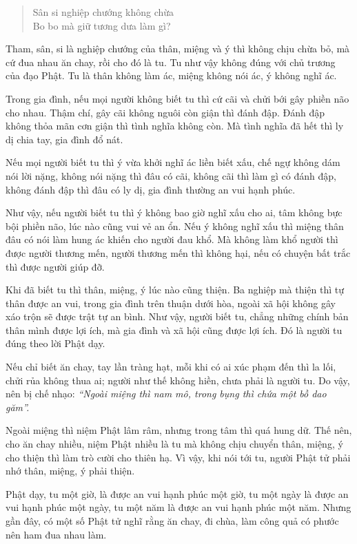 \documentclass[
  12pt,
  oneside]{book}
\begin{document}
\begin{quote}
Sân si nghiệp chướng không chừa\\
Bo bo mà giữ tương dưa làm gì?
\end{quote}

Tham, sân, si là nghiệp chướng của thân, miệng và ý thì không chịu chừa bỏ, mà cứ đua nhau ăn chay, rồi cho đó là tu. Tu như vậy không đúng với chủ trương của đạo Phật. Tu là thân không làm ác, miệng không nói ác, ý không nghĩ ác.

Trong gia đình, nếu mọi người không biết tu thì cứ cãi và chửi bới gây phiền não cho nhau. Thậm chí, gây cãi không nguôi còn giận thì đánh đập. Đánh đập không thỏa mãn cơn giận thì tình nghĩa không còn. Mà tình nghĩa đã hết thì ly dị chia tay, gia đình đổ nát.

Nếu mọi người biết tu thì ý vừa khởi nghĩ ác liền biết xấu, chế ngự không dám nói lời nặng, không nói nặng thì đâu có cãi, không cãi thì làm gì có đánh đập, không đánh đập thì đâu có ly dị, gia đình thường an vui hạnh phúc.

Như vậy, nếu người biết tu thì ý không bao giờ nghĩ xấu cho ai, tâm không bực bội phiền não, lúc nào cũng vui vẻ an ổn. Nếu ý không nghĩ xấu thì miệng thân đâu có nói làm hung ác khiến cho người đau khổ. Mà không làm khổ người thì được người thương mến, người thương mến thì không hại, nếu có chuyện bất trắc thì được người giúp đỡ.

Khi đã biết tu thì thân, miệng, ý lúc nào cũng thiện. Ba nghiệp mà thiện thì tự thân được an vui, trong gia đình trên thuận dưới hòa, ngoài xã hội không gây xáo trộn sẽ được trật tự an bình. Như vậy, người biết tu, chẳng những chính bản thân mình được lợi ích, mà gia đình và xã hội cũng được lợi ích. Đó là người tu đúng theo lời Phật dạy.

Nếu chỉ biết ăn chay, tay lần tràng hạt, mỗi khi có ai xúc phạm đến thì la lối, chửi rủa không thua ai; người như thế không hiền, chưa phải là người tu. Do vậy, nên bị chế nhạo: \emph{``Ngoài miệng thì nam mô, trong bụng thì chứa một bồ dao găm''.}

Ngoài miệng thì niệm Phật lâm râm, nhưng trong tâm thì quá hung dữ. Thế nên, cho ăn chay nhiều, niệm Phật nhiều là tu mà không chịu chuyển thân, miệng, ý cho thiện thì làm trò cười cho thiên hạ. Vì vậy, khi nói tới tu, người Phật tử phải nhớ thân, miệng, ý phải thiện.

Phật dạy, tu một giờ, là được an vui hạnh phúc một giờ, tu một ngày là được an vui hạnh phúc một ngày, tu một năm là được an vui hạnh phúc một năm. Nhưng gần đây, có một số Phật tử nghĩ rằng ăn chay, đi chùa, làm công quả có phước nên ham đua nhau làm.
\end{document}
